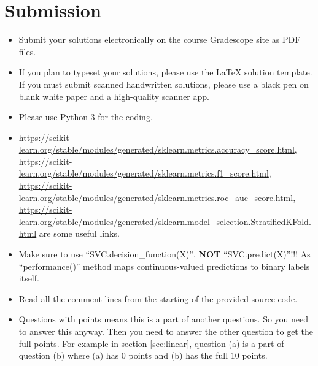 \documentclass[11pt]{article}
\begin{document}
\author{}
\date{}
\maketitle
\vspace{-0.75in}
\vspace{-11pt}

\ifsoln
\else
\section*{Submission}
\begin{itemize}
\item 
Submit your solutions electronically on the course Gradescope site as PDF files.
\item If you plan to typeset your solutions, please use the LaTeX solution template. If you must submit scanned handwritten solutions, please use a black pen on blank white paper and a high-quality scanner app.
\item Please use Python 3 for the coding.
\item  \url{https://scikit-learn.org/stable/modules/generated/sklearn.metrics.accuracy_score.html}, \url{https://scikit-learn.org/stable/modules/generated/sklearn.metrics.f1_score.html}, \url{https://scikit- learn.org/stable/modules/generated/sklearn.metrics.roc_auc_score.html}, \url{https://scikit-learn.org/stable/modules/generated/sklearn.model_selection.StratifiedKFold.html} are some useful links. 
\item Make sure to use ``SVC.decision\_function(X)'', {\bf NOT} ``SVC.predict(X)''!!! As ``performance()'' method maps continuous-valued predictions to binary labels itself.
\item Read all the comment lines from the starting of the provided source code.
\item Questions with  points means this is a part of another questions. So you need to answer this anyway. Then you need to answer the other question to get the full points. For example in section \ref{sec:linear}, question (a) is a part of question (b) where (a) has 0 points and (b) has the full 10 points.
\end{itemize}
\fi
\end{document}

